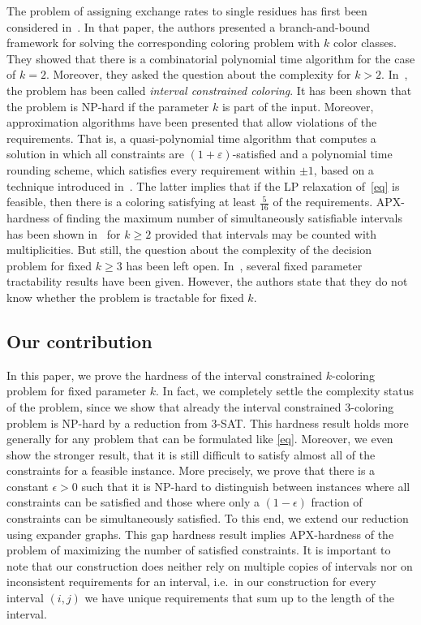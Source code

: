 \documentclass[a4paper,11pt]{article}
\theoremstyle{theorem}
\begin{document}
The problem of assigning exchange rates to single residues has first been considered in~\cite{SAC08}. In that paper, the authors presented a branch-and-bound framework for solving the corresponding coloring problem with $k$ color classes. They showed that there is a combinatorial polynomial time algorithm for the case of $k=2$. Moreover, they asked the question about the complexity for $k > 2$. In~\cite{SWAT08}, the problem has been called \emph{interval constrained coloring}. It has been shown that the problem is NP-hard if the parameter $k$ is part of the input. Moreover, approximation algorithms have been presented that allow violations of the requirements. That is, a quasi-polynomial time algorithm that computes a solution in which all constraints are $(1+\varepsilon)$-satisfied and a polynomial time rounding scheme, which satisfies every requirement within $\pm 1$, based on a technique introduced in~\cite{GKPS06}. The latter implies that if the LP relaxation of~\eqref{eq} is feasible, then there is a coloring satisfying at least $\tfrac{5}{16}$ of the requirements. APX-hardness of finding the maximum number of simultaneously satisfiable intervals has been shown in~\cite{Can08} for $k \ge 2$ provided that intervals may be counted with multiplicities. But still, the question about the complexity of the decision problem for fixed $k \geq 3$ has been left open. In~\cite{KNU09}, several fixed parameter tractability results have been given. However, the authors state that they do not know whether the problem is tractable for fixed $k$. 

\subsection{Our contribution}

In this paper, we prove the hardness of the interval constrained $k$-coloring problem for fixed parameter $k$. In fact, we completely settle the complexity status of the problem, since 
we show that already the interval constrained 3-coloring problem is NP-hard by a reduction from 3-SAT. This hardness result holds more generally for any problem that can be formulated like \eqref{eq}.
Moreover, we even show the stronger result, that it is still difficult to satisfy almost all of the constraints for a feasible instance. More precisely, we prove that there is a constant $\epsilon > 0$ such that it is NP-hard to distinguish between instances where all constraints can be satisfied and those where only a $(1-\epsilon)$ fraction of constraints can be simultaneously satisfied. To this end, we extend our reduction using expander graphs. This gap hardness result implies APX-hardness of the problem of maximizing the number of satisfied constraints. It is important to note that our construction does neither rely on multiple copies of intervals nor on inconsistent requirements for an interval, i.e.~in our construction for every interval $(i,j)$ we have unique requirements that sum up to the length of the interval.
\end{document}

